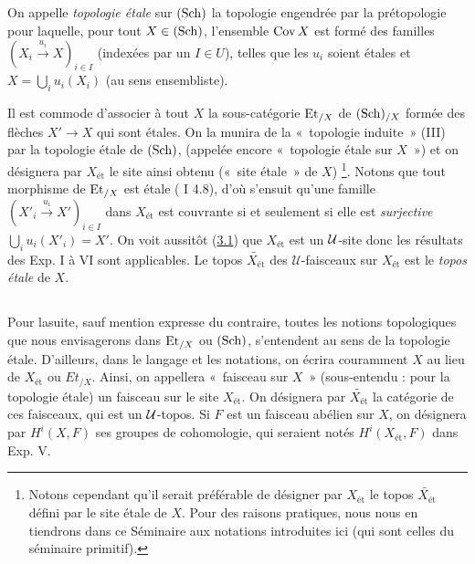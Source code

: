 \documentclass[10pt]{../fichiers-configuration-latex/smfart}
\begin{document}
\subsection{}

On appelle \emph{topologie étale} sur $(\operatorname{Sch})$ la topologie engendrée
par la prétopologie pour laquelle, pour tout $X \in (\operatorname{Sch})$,
l'ensemble $\operatorname{Cov} X$ est formé des familles $(X_i \xrightarrow{u_i} X)_{i
\in I}$ (indexées par un $I \in U$), telles que les $u_i$ soient
étales et $X = \bigcup_{i} u_i (X_i)$ (au sens
ensembliste).

Il est commode d'associer à tout $X$ la sous-catégorie $\operatorname{Et}_{/X}$ de
$(\operatorname{Sch})_{/X}$ formée des flèches $X'\to X$ qui sont étales. On la
munira de la « topologie induite » (III) par la topologie étale de
$(\operatorname{Sch})$, (appelée encore « topologie étale sur $X$ ») et on
désignera par $X_{\text{ét}}$ le site ainsi obtenu (« site étale » de $X$)
\footnote{Notons cependant qu'il serait préférable de désigner par
  $X_{\text{ét}}$ le topos $\widetilde{X_{\text{ét}}}$ défini par
  le site étale de $X$. Pour des raisons pratiques, nous nous en
  tiendrons dans ce Séminaire aux notations introduites ici (qui sont
  celles du séminaire primitif).}. Notons que tout morphisme de
$\operatorname{Et}_{/X}$ est étale ( I 4.8), d'où s'ensuit qu'une famille
$(X'_i \xrightarrow{u_i} X')_{i \in I}$ dans $X_{\text{ét}}$ est couvrante
si et seulement si elle est \emph{surjective} \ie
$\bigcup_{i} u_{i}(X'_{i}) = X'$. On voit aussitôt
(\cf \hyperref[VII.prop3.1]{3.1}) que $X_{\text{ét}}$ est un ${\mathcal U}$-site donc les résultats
des Exp. I à VI sont applicables. Le topos
$\widetilde{X_{\text{ét}}}$ des $𝒰$-faisceaux sur $X_{\text{ét}}$
est le \emph{topos étale} de $X$.

\subsection{}

Pour la\pageoriginale suite, sauf mention expresse du contraire,
toutes les notions
topologiques que nous envisagerons dans $\operatorname{Et}_{/X}$ ou $(\operatorname{Sch})$,
s'entendent au sens de la topologie étale. D'ailleurs, dans le langage
et les notations, on écrira couramment $X$ au lieu de $X_{\text{ét}}$
ou $Et_{/X}$. Ainsi, on appellera « faisceau sur $X$ » (sous-entendu :
pour la topologie étale) un faisceau sur le site $X_{\text{ét}}$. On
désignera par $\widetilde{X_{\text{ét}}}$ la catégorie de ces
faisceaux, qui est un
${\mathcal U}$-topos. Si $F$ est un faisceau abélien sur $X$, on
désignera par $H^{i} (X, F)$ ses groupes de cohomologie, qui seraient
notés $H^{i} (X_{\text{ét}}, F)$ dans Exp. V.
\end{document}
